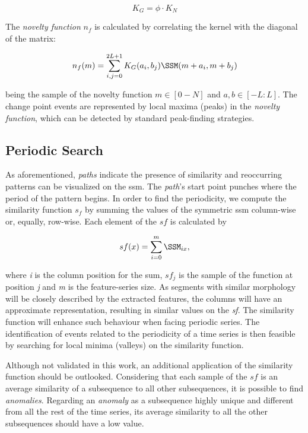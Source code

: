 \begin{equation}
    K_{G} = \phi \cdot K_{N}    
\end{equation}

The \textit{novelty function} $n_f$ is calculated by correlating the kernel with the diagonal of the matrix:

\begin{equation}
    n_f(m) = \sum^{2L+1}_{i,j=0} K_{G}(a_i,b_j)\SSM(m+a_i, m+b_j)
\end{equation}

being the sample of the novelty function $m \in [0-N]$ and $a, b \in [-L:L]$. The change point events are represented by local maxima (peaks) in the \textit{novelty function}, which can be detected by standard peak-finding strategies.

\subsection{Periodic Search}
\label{sec:periodic_search}

As aforementioned, \textit{paths} indicate the presence of similarity and reoccurring patterns can be visualized on the \gls{ssm}. The \textit{path}'s start point punches where the period of the pattern begins. In order to find the periodicity, we compute the similarity function $s_f$ by summing the values of the symmetric \gls{ssm} column-wise or, equally, row-wise. Each element of the $sf$ is calculated by

\begin{equation}
sf(x) = \sum_{i=0}^{m}{\SSM_{ix}},
\end{equation}

\noindent where \textit{i} is the column position for the sum, $sf_{j}$ is the sample of the function at position \textit{j} and \textit{m} is the feature-series size. As segments with similar morphology will be closely described by the extracted features, the columns will have an approximate representation, resulting in similar values on the \textit{sf}. The similarity function will enhance such behaviour when facing periodic series. The identification of events related to the periodicity of a time series is then feasible by searching for local minima (valleys) on the similarity function.

Although not validated in this work, an additional application of the similarity function should be outlooked. Considering that each sample of the $sf$ is an average similarity of a subsequence to all other subsequences, it is possible to find \textit{anomalies}. Regarding an \textit{anomaly} as a subsequence highly unique and different from all the rest of the time series, its average similarity to all the other subsequences should have a low value.

